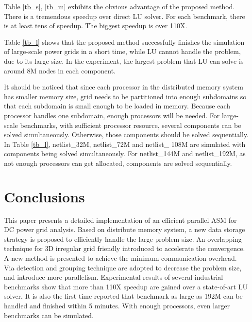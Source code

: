 \documentclass{sig-alternate}
\begin{document}
	Table \ref{tb_s}, \ref{tb_m} exhibits the obvious advantage of the proposed method. There is a tremendous 
	speedup over direct LU solver. For each benchmark, there is at least tens of speedup. The biggest speedup is over 110X. 

	Table \ref{tb_l} shows that the proposed method successfully finishes the simulation of large-scale power grids
	in a short time, while LU cannot handle the problem, due to its large size. In the experiment, the largest problem that LU 
	can solve is around 8M nodes in each component. 

	It should be noticed that since each processor in the distributed memory system has smaller memory size, grid needs to be 
	partitioned into enough subdomains so that each subdomain is small enough to be loaded in memory. Because each processor handles 
	one 
	subdomain, enough processors will be needed. For large-scale benchmarks, with sufficient processor resource, several 
	components can be solved simultaneously. Otherwise, those components should be 
	solved sequentially. In Table \ref{tb_l}, netlist\_32M, netlist\_72M and netlist\_
	108M are 
	simulated with components being solved simultaneously. For netlist\_144M and 
	netlist\_192M, as not enough processors can get allocated, components are solved sequentially.

\section{Conclusions}
	This paper presents a detailed implementation of an efficient parallel ASM for DC power grid analysis. Based on distribute memory 
	system, a new data storage strategy is proposed to efficiently handle the large problem size. An overlapping technique for 3D 
	irregular grid friendly introduced to accelerate the convergence. A new method is presented to achieve the minimum communication overhead. Via 
	detection and grouping technique are adopted to decrease the problem size, and introduce more parallelism. Experimental 
	results of several industrial benchmarks show that more than 110X speedup are gained over a state-of-art LU solver. It is also 
	the first time reported that benchmark as large as 192M can be handled and finished within 5 minutes. With enough processors, 
	even larger benchmarks can be simulated.



\end{document}
